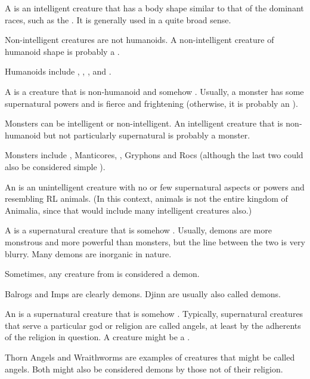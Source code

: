 A  is an intelligent creature that has a body shape similar to that of the dominant races, such as the \scathae{}. It is generally used in a quite broad sense. %

Non-intelligent creatures are not humanoids. A non-intelligent creature of humanoid shape is probably a . 

Humanoids include \humans{}, \scathae{}, \meccara{}, \nagae{} and \cregorrs{}. 

A  is a creature that is non-humanoid and somehow . Usually, a monster has some supernatural powers and is fierce and frightening (otherwise, it is probably an ). 

Monsters can be intelligent or non-intelligent. An intelligent creature that is non-humanoid but not particularly supernatural is probably a monster. 

Monsters include \dragons{}, Manticores, \wyverns{}, Gryphons and Rocs (although the last two could also be considered simple ). 

An  is an unintelligent creature with no or few supernatural aspects or powers and resembling RL animals. (In this context, animals is not the entire kingdom of Animalia, since that would include many intelligent creatures also.) 

A  is a supernatural creature that is somehow . Usually, demons are more monstrous and more powerful than monsters, but the line between the two is very blurry. Many demons are inorganic in nature. 

Sometimes, any creature from \Tuat{} is considered a demon. 

Balrogs and Imps are clearly demons. Djinn are usually also called demons. 

An  is a supernatural creature that is somehow . Typically, supernatural creatures that serve a particular god or religion are called angels, at least by the adherents of the religion in question. A creature might be a . %

Thorn Angels and Wraithworms are examples of creatures that might be called angels. Both might also be considered demons by those not of their religion. 

